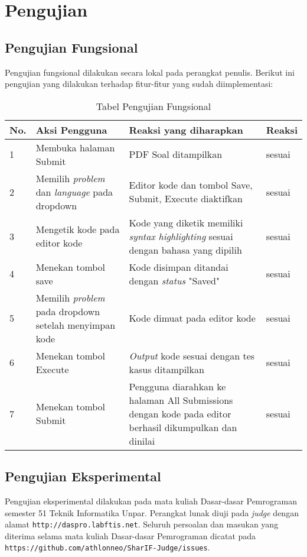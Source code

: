 \section{Pengujian}
\label{subsec:5:pengujian}

\subsection{Pengujian Fungsional}
\label{subsec:5:fungsional}

Pengujian fungsional dilakukan secara lokal pada perangkat penulis. Berikut ini pengujian yang dilakukan terhadap fitur-fitur yang sudah diimplementasi:

\begin{table}[H]
	\centering
	\caption{Tabel Pengujian Fungsional}
	\begin{tabular}{|p{0.5cm}| p{5.5cm}| p{6cm}| p{2.5cm}|} \hline
	No.	&	Aksi Pengguna	&	Reaksi yang diharapkan	&	Reaksi \\ \hline
	1 	&  Membuka halaman Submit & PDF Soal ditampilkan &	sesuai	\\ \hline
	2 	&  Memilih \textit{problem} dan \textit{language} pada dropdown & Editor kode dan tombol Save, Submit, Execute diaktifkan &	sesuai	\\ \hline
	3 	&  Mengetik kode pada editor kode & Kode yang diketik memiliki \textit{syntax highlighting} sesuai dengan bahasa yang dipilih &	sesuai	\\ \hline
	4 	&  Menekan tombol save & Kode disimpan ditandai dengan \textit{status} "Saved" &	sesuai	\\ \hline
	5 	&  Memilih \textit{problem} pada dropdown setelah menyimpan kode & Kode dimuat pada editor kode &	sesuai	\\ \hline
	6 	&  Menekan tombol Execute & \textit{Output} kode sesuai dengan tes kasus ditampilkan &	sesuai	\\ \hline
	7 	&  Menekan tombol Submit & Pengguna diarahkan ke halaman All Submissions dengan kode pada editor berhasil dikumpulkan dan dinilai  &	sesuai	\\ \hline
	\end{tabular}
	\label{table:fungsional}
\end{table}


\subsection{Pengujian Eksperimental}
\label{subsec:5:eksperimental}

Pengujian eksperimental dilakukan pada mata kuliah Dasar-dasar Pemrograman semester 51 Teknik Informatika Unpar. Perangkat lunak diuji pada \textit{judge} dengan alamat \verb|http://daspro.labftis.net|. Seluruh persoalan dan masukan yang diterima selama mata kuliah Dasar-dasar Pemrograman dicatat pada \verb|https://github.com/athlonneo/SharIF-Judge/issues|.

